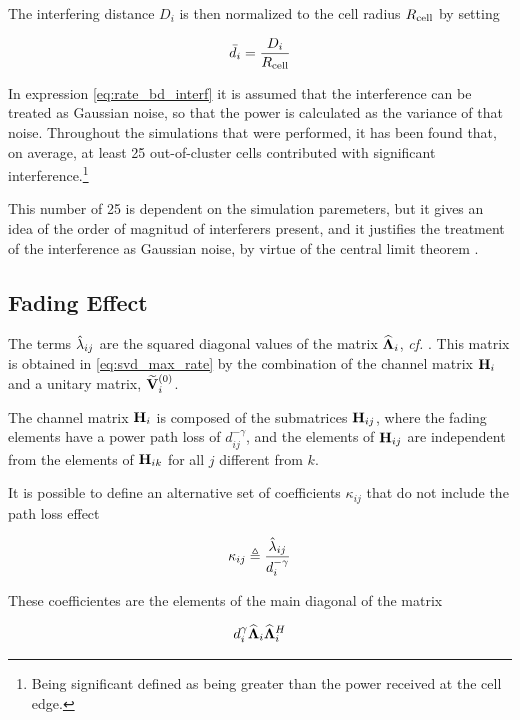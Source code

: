 The interfering distance $D_i$ is then normalized to the cell radius $R_{\text{cell}}$ by
setting

\begin{equation} \label{eq:interf_dist_norm}
    \bar{d}_i = \frac{D_i}{R_{\text{cell}}}
\end{equation}

In expression \eqref{eq:rate_bd_interf} it is assumed that the interference can
be treated as Gaussian noise, so that the power is calculated as the variance
of that noise. Throughout the simulations that were performed, it has been found
that, on average, at least 25 out-of-cluster cells contributed with significant
interference.\footnote{Being significant defined as being greater than the power
received at the cell edge.}

This number of 25 is dependent on the simulation paremeters, but it gives an
idea of the order of magnitud of interferers present, and it justifies the
treatment of the interference as Gaussian noise, by virtue of the central limit
theorem \cite{papoulis_fourier}.

\subsection{Fading Effect}\label{ssec:achiev_rate_fading}

The terms $\hat{\lambda}_{ij}$ are the squared diagonal values of the matrix
$\mathbf{\widehat{\Lambda}}_i$, \emph{cf.} . This matrix is obtained in
\eqref{eq:svd_max_rate} by the combination of the channel matrix $\mathbf{H}_i$ and a
unitary matrix, $\mathbf{\widetilde{V}}_i^{(0)}$.

The channel matrix $\mathbf{H}_i$ is composed of the submatrices $\mathbf{H}_{ij}$, where the
fading elements have a power path loss of $d_{ij}^{-\gamma}$, and the elements
of $\mathbf{H}_{ij}$ are independent from the elements of $\mathbf{H}_{ik}$ for all $j$
different from $k$.

It is possible to define an alternative set of coefficients $\kappa_{ij}$ that
do not include the path loss effect

\begin{equation} \label{eq:kappa_coeff}
    \kappa_{ij} \triangleq \frac{\hat{\lambda}_{ij}}{d_{i}^{-\gamma}}
\end{equation}

These coefficientes are the elements of the main diagonal of the matrix

\begin{equation} \label{eq:diag_matrix_no_path_loss}
    d_{i}^{\gamma}\mathbf{\widehat{\Lambda}}_i \mathbf{\widehat{\Lambda}}_i^H
\end{equation}

